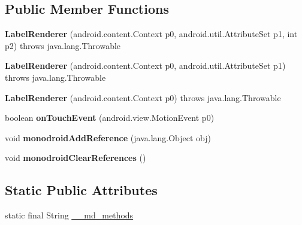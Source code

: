 \subsection*{Public Member Functions}
\begin{DoxyCompactItemize}
\item 
\mbox{\label{classmd5b60ffeb829f638581ab2bb9b1a7f4f3f_1_1LabelRenderer_a676d9f280baafbc8b1cd2f8d192d5420}} 
{\bfseries Label\+Renderer} (android.\+content.\+Context p0, android.\+util.\+Attribute\+Set p1, int p2)  throws java.\+lang.\+Throwable 	
\item 
\mbox{\label{classmd5b60ffeb829f638581ab2bb9b1a7f4f3f_1_1LabelRenderer_adf11c884aea9ad69b88f2bc2c1c60b48}} 
{\bfseries Label\+Renderer} (android.\+content.\+Context p0, android.\+util.\+Attribute\+Set p1)  throws java.\+lang.\+Throwable 	
\item 
\mbox{\label{classmd5b60ffeb829f638581ab2bb9b1a7f4f3f_1_1LabelRenderer_a145238d242c95398df7762a0dee92f4c}} 
{\bfseries Label\+Renderer} (android.\+content.\+Context p0)  throws java.\+lang.\+Throwable 	
\item 
\mbox{\label{classmd5b60ffeb829f638581ab2bb9b1a7f4f3f_1_1LabelRenderer_a364b8f793419ee7c9d991b140708c0b5}} 
boolean {\bfseries on\+Touch\+Event} (android.\+view.\+Motion\+Event p0)
\item 
\mbox{\label{classmd5b60ffeb829f638581ab2bb9b1a7f4f3f_1_1LabelRenderer_a5c75833e54cbdb93423612b6013f3ca2}} 
void {\bfseries monodroid\+Add\+Reference} (java.\+lang.\+Object obj)
\item 
\mbox{\label{classmd5b60ffeb829f638581ab2bb9b1a7f4f3f_1_1LabelRenderer_a8dd6dcc97dd63731d463ac57c6c6bf08}} 
void {\bfseries monodroid\+Clear\+References} ()
\end{DoxyCompactItemize}
\subsection*{Static Public Attributes}
\begin{DoxyCompactItemize}
\item 
static final String \hyperlink{classmd5b60ffeb829f638581ab2bb9b1a7f4f3f_1_1LabelRenderer_a6d75a8c95caaa11a9bbc9581bb0151b3}{\+\_\+\+\_\+md\+\_\+methods}
\end{DoxyCompactItemize}
